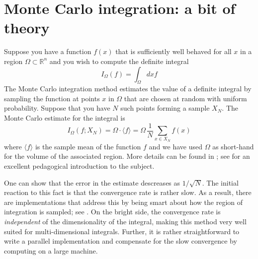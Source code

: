 %
%

\section{Monte Carlo integration: a bit of theory}
\label{sec:montecarlo}

Suppose you have a function $f(x)$ that is sufficiently well behaved for
all $x$ in a region $\Omega \subset \mathbb{R}^{n}$ and you wish to compute the
definite integral
%
\begin{equation}
  I_{\Omega} (f)
  =
  \int_{\Omega} dx f
\label{eq:integral}
\end{equation}
%
The Monte Carlo integration method estimates the value of a definite integral by sampling
the function at points $x$ in $\Omega$ that are chosen at random with uniform
probability. Suppose that you have $N$ such points forming a sample $X_{N}$. The Monte
Carlo estimate for the integral is
%
\begin{equation}
  I_{\Omega} (f; X_{N})
  =
  \Omega \cdot \langle f \rangle
  =
  \Omega \, \frac{1}{N} \sum_{x \in X_{N}} f(x)
\label{eq:mc-estimate}
\end{equation}
%
where $\langle f \rangle$ is the sample mean of the function $f$ and we have used $\Omega$
as short-hand for the volume of the associated region. More details can be found in
\citep{hammersley,ueberhuber}; see \cite{weinzierl} for an excellent pedagogical
introduction to the subject.

One can show that the error in the estimate descreases as $1/\sqrt{N}$. The initial reaction to
this fact is that the convergence rate is rather slow. As a result, there are implementations
that address this by being smart about how the region of integration is sampled; see
\cite{lepage-78,lepage-80,press}. On the bright side, the convergence rate is {\em independent}
of the dimensionality of the integral, making this method very well suited for
multi-dimensional integrals. Further, it is rather straightforward to write a parallel
implementation and compensate for the slow convergence by computing on a large machine.

